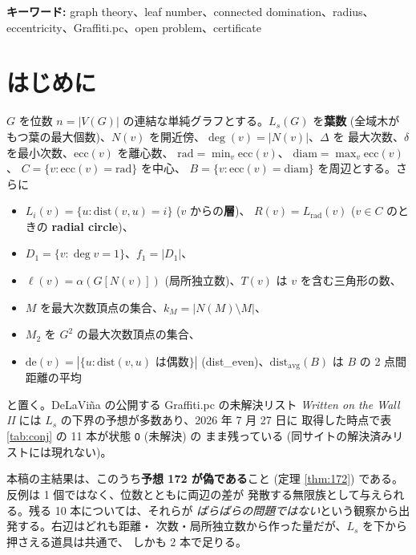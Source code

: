 \documentclass[paper=a4,fontsize=10.5pt,jafontsize=10.5pt]{jlreq}
\theoremstyle{plain}
\theoremstyle{definition}
\begin{document}
\noindent\textbf{キーワード:} graph theory、leaf number、connected domination、radius、eccentricity、Graffiti.pc、open problem、certificate


\section{はじめに}

$G$ を位数 $n = |V(G)|$ の連結な単純グラフとする。$L_s(G)$ を\textbf{葉数}
(全域木がもつ葉の最大個数)、$N(v)$ を開近傍、$\deg(v) = |N(v)|$、$\Delta$ を
最大次数、$\delta$ を最小次数、$\mathrm{ecc}(v)$ を離心数、
$\mathrm{rad} = \min_v \mathrm{ecc}(v)$、
$\mathrm{diam} = \max_v \mathrm{ecc}(v)$、
$C = \{v : \mathrm{ecc}(v) = \mathrm{rad}\}$ を中心、
$B = \{v : \mathrm{ecc}(v) = \mathrm{diam}\}$ を周辺とする。さらに

\begin{itemize}
\item $L_i(v) = \{u : \mathrm{dist}(v,u) = i\}$ ($v$ からの\textbf{層})、
  $R(v) = L_{\mathrm{rad}}(v)$ ($v \in C$ のときの \textbf{radial circle})、
\item $D_1 = \{v : \deg v = 1\}$、$f_1 = |D_1|$、
\item $\ell(v) = \alpha(G[N(v)])$ (局所独立数)、$T(v)$ は $v$ を含む三角形の数、
\item $M$ を最大次数頂点の集合、$k_M = |N(M) \setminus M|$、
\item $M_2$ を $G^2$ の最大次数頂点の集合、
\item $\mathrm{de}(v) = |\{u : \mathrm{dist}(v,u) \text{ は偶数}\}|$
  (\textsf{dist\_even})、$\mathrm{dist_{avg}}(B)$ は $B$ の 2 点間距離の平均
\end{itemize}

と置く。DeLaViña の公開する Graffiti.pc の未解決リスト \emph{Written on the
Wall II} \cite{wowii} には $L_s$ の下界の予想が多数あり、2026 年 7 月 27 日に
取得した時点で表 \ref{tab:conj} の 11 本が状態 \texttt{O} (未解決) の
まま残っている (同サイトの解決済みリストには現れない)。

本稿の主結果は、このうち\textbf{予想 172 が偽である}こと (定理
\ref{thm:172}) である。反例は 1 個ではなく、位数とともに両辺の差が
発散する無限族として与えられる。残る 10 本については、それらが
\emph{ばらばらの問題ではない}という観察から出発する。右辺はどれも距離・
次数・局所独立数から作った量だが、$L_s$ を下から押さえる道具は共通で、
しかも 2 本で足りる。
\end{document}
